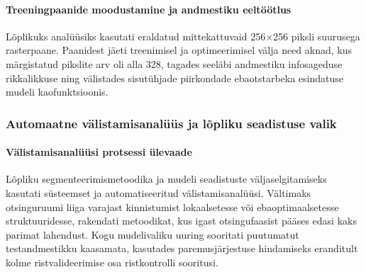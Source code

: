     \paragraph{Treeningpaanide moodustamine ja andmestiku eeltöötlus}
    Lõplikuks analüüsiks kasutati eraldatud mittekattuvaid 256$\times$256 piksli suurusega rasterpaane. Paanidest jäeti treenimisel ja optimeerimisel välja need aknad, kus märgistatud pikslite arv oli alla 328, tagades seeläbi andmestiku infosageduse rikkalikkuse ning välistades sisutühjade piirkondade ebaotstarbeka esindatuse mudeli kaofunktsioonis. 

    \subsubsection{Automaatne välistamisanalüüs ja lõpliku seadistuse valik}

    \paragraph{Välistamisanalüüsi protsessi ülevaade} Lõpliku segmenteerimismetoodika ja mudeli seadistuste väljaselgitamiseks kasutati süsteemset ja automatiseeritud välistamisanalüüsi. Vältimaks otsinguruumi liiga varajast kinnistumist lokaalsetesse või ebaoptimaalsetesse struktuuridesse, rakendati metoodikat, kus igast otsingufaasist pääses edasi kaks parimat lahendust. Kogu mudelivaliku uuring sooritati puutumatut testandmestikku kaasamata, kasutades paremusjärjestuse hindamiseks eranditult kolme ristvalideerimise osa ristkontrolli sooritusi.

